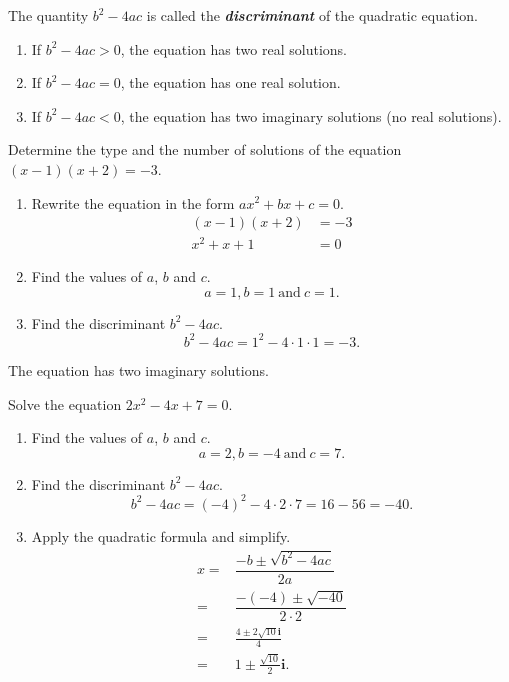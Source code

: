 \documentclass[en,12pt]{elegantbook}
\providecommand{\tightlist}{%
  \setlength{\itemsep}{0pt}\setlength{\parskip}{0pt}}
\newcommand{\ii}{\mathbf{i}}
\providecommand{\tightlist}{%
  \setlength{\itemsep}{0pt}\setlength{\parskip}{0pt}}
\let\BeginKnitrBlock\begin \let\EndKnitrBlock\end
\begin{document}
The quantity \(b^2-4ac\) is called the \textbf{\emph{discriminant}} of the quadratic equation.

\begin{enumerate}
\def\labelenumi{\arabic{enumi}.}
\tightlist
\item
  If \(b^2-4ac>0\), the equation has two real solutions.
\item
  If \(b^2-4ac=0\), the equation has one real solution.
\item
  If \(b^2-4ac<0\), the equation has two imaginary solutions (no real solutions).
\end{enumerate}

\BeginKnitrBlock{example}
\protect\hypertarget{exm:unnamed-chunk-129}{}{\label{exm:unnamed-chunk-129} }
Determine the type and the number of solutions of the equation \((x-1)(x+2)=-3\).
\EndKnitrBlock{example}

\BeginKnitrBlock{solution}


\begin{enumerate}
\def\labelenumi{\arabic{enumi}.}
\tightlist
\item
  Rewrite the equation in the form \(ax^2+bx+c=0\).
  \[
       \begin{aligned}
           (x-1)(x+2)&=-3\\
           x^2+x+1&=0
       \end{aligned}
   \]
\item
  Find the values of \(a\), \(b\) and \(c\).
  \[
       a=1, b=1 ~\text{and}~ c=1.
   \]
\item
  Find the discriminant \(b^2-4ac\).
  \[
       b^2-4ac=1^2-4\cdot 1\cdot 1=-3.
   \]
\end{enumerate}

The equation has two imaginary solutions.
\EndKnitrBlock{solution}

\BeginKnitrBlock{example}
\protect\hypertarget{exm:unnamed-chunk-131}{}{\label{exm:unnamed-chunk-131} }
Solve the equation \(2x^2-4x+7=0\).
\EndKnitrBlock{example}

\BeginKnitrBlock{solution}


\begin{enumerate}
\def\labelenumi{\arabic{enumi}.}
\tightlist
\item
  Find the values of \(a\), \(b\) and \(c\).
  \[
       a=2, b=-4 ~\text{and}~ c=7.
   \]
\item
  Find the discriminant \(b^2-4ac\).
  \[
       b^2-4ac=(-4)^2-4\cdot 2\cdot 7=16-56=-40.
   \]
\item
  Apply the quadratic formula and simplify.
  \[
   \begin{aligned}
       x=&\dfrac{-b\pm\sqrt{b^2-4ac}}{2a}\\
       =&\dfrac{-(-4)\pm\sqrt{-40}}{2\cdot 2}\\
       =&\frac{4\pm 2\sqrt{10} \ii}{4}\\
       =&1\pm\frac{\sqrt{10}}{2}\ii.
   \end{aligned}
   \]
\end{enumerate}
\EndKnitrBlock{solution}
\end{document}
